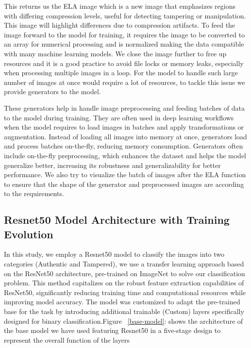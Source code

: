 \documentclass{ieeeaccess}
\begin{document}
This returns us the ELA image which is a new image that emphasizes regions with differing compression levels, useful for detecting tampering or manipulation. This image will highlight differences due to compression artifacts. To feed the image forward to the model for training, it requires the image to be converted to an array for numerical processing and is normalized making the data compatible with many machine learning models. We close the image further to free up resources and it is a good practice to avoid file locks or memory leaks, especially when processing multiple images in a loop. For the model to handle such large number of images at once would require a lot of resources, to tackle this issue we provide generators to the model.

These generators help in handle image preprocessing and feeding batches of data to the model during training. They are often used in deep learning workflows when the model requires to load images in batches and apply transformations or augmentation. Instead of loading all images into memory at once, generators load and process batches on-the-fly, reducing memory consumption. Generators often include on-the-fly preprocessing, which enhances the dataset and helps the model generalize better, increasing its robustness and generalizability for better performance.
We also try to visualize the batch of images after the ELA function to ensure that the 	shape of the generator and preprocessed images are according to the requirements.

\subsection{Resnet50 Model Architecture with Training Evolution }
In this study, we employ a Resnet50 model to classify the images into two categories (Authentic and Tampered), we use a transfer learning approach based on the ResNet50 architecture, pre-trained on ImageNet to solve our classification problem. This method capitalizes on the robust feature extraction capabilities of ResNet50, significantly reducing training time and computational resources while improving model accuracy. The model was customized to adapt the pre-trained base for the task by introducing additional trainable (Custom) layers specifically designed for binary classification.Figure ~\ref{base-model}: shows the architecture of the base model we have used featuring Resnet50 in a five-stage design to represent the overall function of the layers
\end{document}
